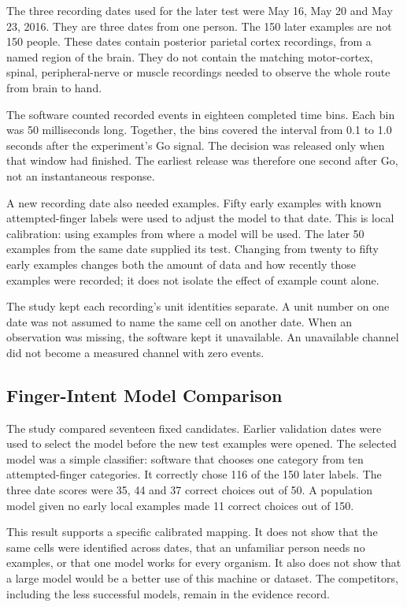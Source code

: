 The three recording dates used for the later test were May 16, May 20 and May
23, 2016. They are three dates from one person. The 150 later examples are not
150 people. These dates contain posterior parietal cortex recordings, from a
named region of the brain. They do not contain the matching motor-cortex,
spinal, peripheral-nerve or muscle recordings needed to observe the whole route
from brain to hand.

The software counted recorded events in eighteen completed time bins. Each bin
was 50 milliseconds long. Together, the bins covered the interval from 0.1 to
1.0 seconds after the experiment's Go signal. The decision was released only
when that window had finished. The earliest release was therefore one second
after Go, not an instantaneous response.

A new recording date also needed examples. Fifty early examples with known
attempted-finger labels were used to adjust the model to that date. This is
local calibration: using examples from where a model will be used. The later
50 examples from the same date supplied its test. Changing from twenty to fifty
early examples changes both the amount of data and how recently those examples
were recorded; it does not isolate the effect of example count alone.

The study kept each recording's unit identities separate. A unit number on one
date was not assumed to name the same cell on another date. When an observation
was missing, the software kept it unavailable. An unavailable channel did not
become a measured channel with zero events.

\subsection{Finger-Intent Model Comparison}

The study compared seventeen fixed candidates. Earlier validation dates were
used to select the model before the new test examples were opened. The selected
model was a simple classifier: software that chooses one category from ten
attempted-finger categories. It correctly chose 116 of the 150 later labels.
The three date scores were 35, 44 and 37 correct choices out of 50. A population
model given no early local examples made 11 correct choices out of 150.

This result supports a specific calibrated mapping. It does not show that the
same cells were identified across dates, that an unfamiliar person needs no
examples, or that one model works for every organism. It also does not show that
a large model would be a better use of this machine or dataset. The competitors,
including the less successful models, remain in the evidence record.

